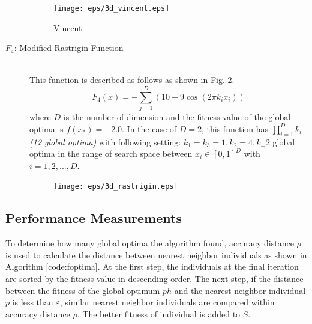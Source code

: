 \documentclass[conference]{IEEEtran}
\begin{document}
\begin{description}
\begin{figure}[h]
\begin{center}
	\texttt{[image: eps/3d\_vincent.eps]}
\caption{Vincent}
\label{fig:f3}
\end{center}
\end{figure}

\item[$F_4$: Modified Rastrigin Function]\mbox{}\\
 This function is described as follows as shown in Fig. \ref{fig:f4}.
 \begin{equation}
F_4(x) = -\sum_{j=1}^D (10+9 \cos(2 \pi k_i x_i)) 
\end{equation}
where $D$ is the number of dimension and the fitness value of the global optima is ${f(x_*)=-2.0}$. In the case of $D=2$, this function has $\prod_{i=1}^D k_i$ \textit{(12 global optima)} with following setting: $k_1=k_3=1, k_2=4, k_=2$  global optima in the range of search space between $x_i \in [0, 1]^D$ with $i=1,2,...,D$.

\begin{figure}[h]
\begin{center}
	\texttt{[image: eps/3d\_rastrigin.eps]}
\label{fig:f4}
\end{center}
\end{figure}

\end{description}

\subsection{Performance Measurements}
To determine how many global optima the algorithm found, accuracy distance $\rho$ is used to calculate the distance between nearest neighbor individuals as shown in Algorithm \ref{code:foptima}. At the first step, the individuals at the final iteration are sorted by the fitness value in descending order. The next step, if the distance between the fitness of the global optimum $ph$ and the nearest neighbor individual $p$ is less than $\varepsilon$, similar nearest neighbor individuals are compared within accuracy distance $\rho$. The better fitness of individual is added to $S$.
\end{document}
